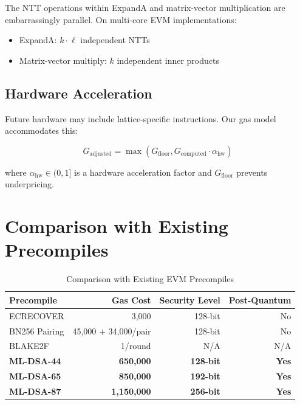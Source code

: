 \documentclass[11pt,a4paper]{article}
\begin{document}
The NTT operations within ExpandA and matrix-vector multiplication are embarrassingly parallel. On multi-core EVM implementations:

\begin{itemize}
    \item ExpandA: $k \cdot \ell$ independent NTTs
    \item Matrix-vector multiply: $k$ independent inner products
\end{itemize}

\subsection{Hardware Acceleration}

Future hardware may include lattice-specific instructions. Our gas model accommodates this:

\begin{equation}
G_{\text{adjusted}} = \max(G_{\text{floor}}, G_{\text{computed}} \cdot \alpha_{\text{hw}})
\end{equation}

where $\alpha_{\text{hw}} \in (0, 1]$ is a hardware acceleration factor and $G_{\text{floor}}$ prevents underpricing.

\section{Comparison with Existing Precompiles}

\begin{table}[htbp]
\centering
\caption{Comparison with Existing EVM Precompiles}
\label{tab:comparison}
\begin{tabular}{@{}lrrr@{}}
\toprule
Precompile & Gas Cost & Security Level & Post-Quantum \\
\midrule
ECRECOVER & 3,000 & 128-bit & No \\
BN256 Pairing & 45,000 + 34,000/pair & 128-bit & No \\
BLAKE2F & 1/round & N/A & N/A \\
\textbf{ML-DSA-44} & \textbf{650,000} & \textbf{128-bit} & \textbf{Yes} \\
\textbf{ML-DSA-65} & \textbf{850,000} & \textbf{192-bit} & \textbf{Yes} \\
\textbf{ML-DSA-87} & \textbf{1,150,000} & \textbf{256-bit} & \textbf{Yes} \\
\bottomrule
\end{tabular}
\end{table}
\end{document}
